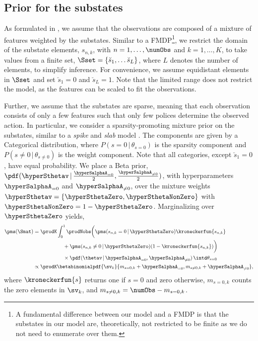 \documentclass{article}
\begin{document}
\subsection{Prior for the substates}
\label{sec::model::smat}
As formulated in , we assume that the observations are composed of a mixture of features weighted by the substates. 
Similar to a \ac{FMDP}\footnote{A fundamental difference between our model and a \ac{FMDP} is that the substates in our model are, theoretically, not restricted to be finite as we do not need to enumerate over them.}, we restrict the domain of the substate elements, $s_{n,k}$, with $n=1,\ldots,\numObs$ and $k=1,\ldots,K$, to take values from a finite set, $\Sset = \{ \breve{s}_1, \ldots \breve{s}_L\}$, where $L$ denotes the number of elements, to simplify inference. For convenience, we assume equidistant elements in $\Sset$ and set $\breve{s}_1 = 0$ and $\breve{s}_L = 1$. Note that the limited range does not restrict the model, as the features can be scaled to fit the observations.

Further, we assume that the substates are sparse, meaning that each observation consists of only a few features such that only few polices determine the observed action. 
In particular, we consider a sparsity-promoting mixture prior on the substates, similar to a \emph{spike} and \emph{slab} model \cite{Mitchell1988,Ishwaran2005}. 
The components are given by a Categorical distribution, where $P(s = 0\,|\,\theta_{s=0})$ is the sparsity component and $P(s \neq 0\,|\,\theta_{s\neq0})$ is the weight component. Note that all categories, except $\breve{s}_1 = 0$, have equal probability. 
We place a Beta prior, $\pdf(\hyperSthetav \,|\, \frac{\hyperSalphaA_{=0}}{2}, \frac{\hyperSalphaA_{\neq0}}{2})$, with hyperparameters $\hyperSalphaA_{=0}$ and $\hyperSalphaA_{\neq0}$, over the mixture weights $ \hyperSthetav = \{\hyperSthetaZero, \hyperSthetaNonZero\}$ with $\hyperSthetaNonZero = 1-\hyperSthetaZero$. Marginalizing over $\hyperSthetaZero$ yields,
\begin{align*}
    \pms(\Smat) & = \prodK \int_0^1 \prodNobs \bigg( \pms(s_{n,k}=0\,|\,\hyperSthetaZero) \kroneckerfun{s_{n,k}} 
 \\             & \hspace{2cm}  + \pms(s_{n,k}\neq0\,|\,\hyperSthetaZero) (1- \kroneckerfun{s_{n,k}}) \bigg) 
 \\             & \hspace{2cm}  \times \pdf(\thetav \,|\, \hyperSalphaA_{=0},\hyperSalphaA_{\neq0}) \, \intd\theta_{s=0}
 \\             & \propto  \prodK \betabinomialpdf{\sv_k}{ m_{s=0,k} + \hyperSalphaA_{=0}, m_{s\neq0,k} + \hyperSalphaA_{\neq0}},
\end{align*}
where $\kroneckerfun{s}$ returns one if $s=0$ and zero otherwise, $m_{s=0,k}$ counts the zero elements in $\sv_k$, and $m_{s\neq0,k} = \numObs - m_{s=0,k}$. 
\end{document}
